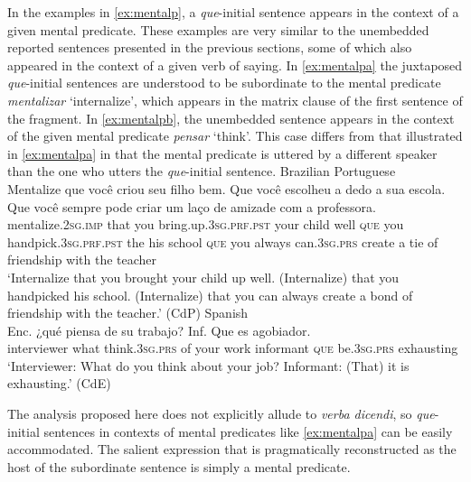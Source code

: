 In the examples in \eqref{ex:mentalp}, a \emph{que}-initial sentence appears in the context of a given mental
predicate. These examples are very similar to the unembedded reported sentences presented
in the previous sections,  some of which also appeared in the context of a given verb
of saying. In \eqref{ex:mentalpa} the juxtaposed \emph{que}-initial sentences are understood to be subordinate to
the mental predicate \emph{mentalizar} `internalize', which appears in the matrix clause of the first
sentence of the fragment. In \eqref{ex:mentalpb}, the unembedded sentence appears in the context of the given mental predicate \emph{pensar} `think'. This case differs from that illustrated in \eqref{ex:mentalpa} in that the mental predicate is uttered by a different speaker than the one who utters the
\emph{que}-initial sentence.
\ea 
	\label{ex:mentalp}
\ea	\label{ex:mentalpa} 
 Brazilian Portuguese \\
 \gll Mentalize que você criou
seu filho bem. Que você {escolheu a dedo} a
sua escola. Que você sempre pode criar um laço de amizade com a professora. \\
mentalize.\textsc{2sg.imp} that you {bring.up}.\textsc{3sg.prf.pst} your child well \textsc{que} you handpick.\textsc{3sg.prf.pst}
the
his school \textsc{que} you always can.\textsc{3sg.prs} create a tie of friendship with the
teacher
\\
\glt  `Internalize that you brought your child up well. (Internalize) that you handpicked
his school. (Internalize) that you can always create a bond of friendship with the
teacher.' (CdP) 
\ex \label{ex:mentalpb} 
 Spanish\\ 
\gll 	 Enc.
¿qué piensa
de su trabajo? Inf. Que es agobiador.
\\
interviewer what think.\textsc{3sg.prs} of your work
informant \textsc{que} be.\textsc{3sg.prs} exhausting
\\
\glt `Interviewer: What do you think about your job? Informant: (That) it is exhausting.' (CdE)
	\z
\z

The analysis proposed here does not explicitly allude to \emph{verba dicendi}, so  \emph{que}-initial sentences in contexts of mental predicates like \eqref{ex:mentalpa} can be easily accommodated. The salient expression that is pragmatically reconstructed as the host of the subordinate sentence is simply a mental predicate. 

